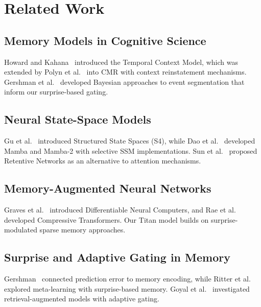 \section{Related Work}

\subsection{Memory Models in Cognitive Science}
Howard and Kahana~\cite{howard2002temporal} introduced the Temporal Context Model, which was extended by Polyn et al.~\cite{polyn2009context} into CMR with context reinstatement mechanisms. Gershman et al.~\cite{gershman2017bayesian} developed Bayesian approaches to event segmentation that inform our surprise-based gating.

\subsection{Neural State-Space Models}
Gu et al.~\cite{gu2021s4} introduced Structured State Spaces (S4), while Dao et al.~\cite{dao2023mamba} developed Mamba and Mamba-2 with selective SSM implementations. Sun et al.~\cite{sun2023retnet} proposed Retentive Networks as an alternative to attention mechanisms.


\subsection{Memory-Augmented Neural Networks}
Graves et al.~\cite{graves2016dnc} introduced Differentiable Neural Computers, and Rae et al.~\cite{rae2020compressive} developed Compressive Transformers. Our Titan model builds on surprise-modulated sparse memory approaches.


\subsection{Surprise and Adaptive Gating in Memory}
Gershman~\cite{gershman2019prediction} connected prediction error to memory encoding, while Ritter et al.~\cite{ritter2018meta} explored meta-learning with surprise-based memory. Goyal et al.~\cite{goyal2022retrieval} investigated retrieval-augmented models with adaptive gating.

